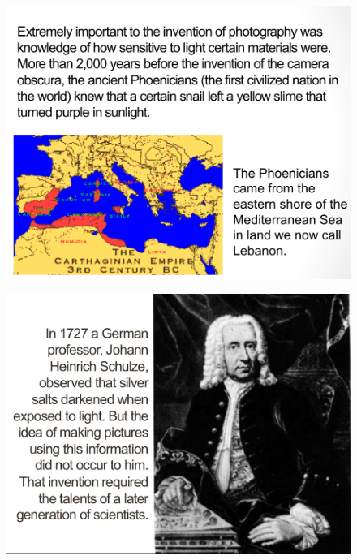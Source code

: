 \documentclass{beamer}
\begin{document}
\begin{frame}
	\begin{figure}
		\centering
		\includegraphics[scale=0.4]{73.jpg}
	\end{figure}
\end{frame}

\begin{frame}
	\begin{figure}
		\centering
		\includegraphics[scale=0.4]{74.jpg}
	\end{figure}
\end{frame}
\end{document}
